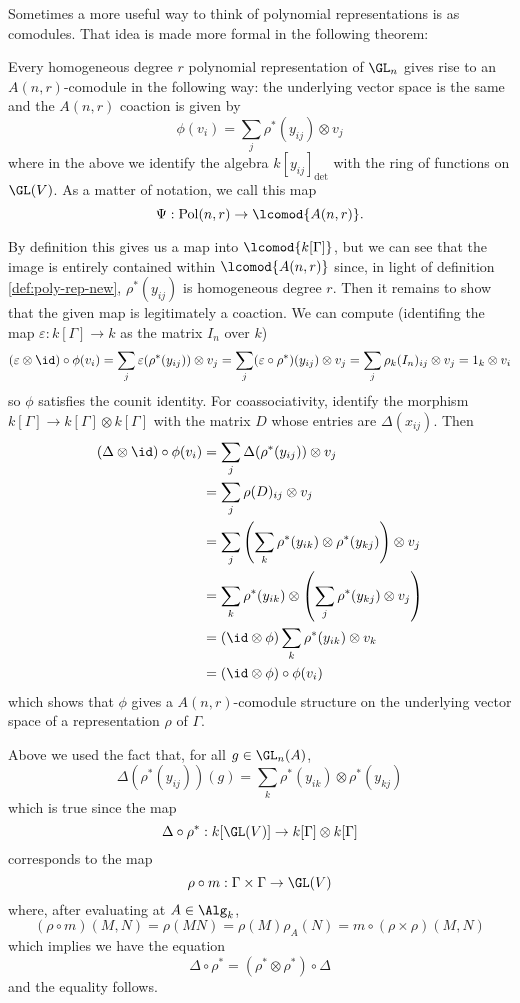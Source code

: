 \documentclass[12pt]{article}
\DeclareMathOperator{\Pol}{Pol}
\begin{document}
Sometimes a more useful way to think of polynomial representations is as comodules. That idea is made more formal
in the following theorem:
\begin{lem}\label{lem:comod-map}
	Every homogeneous degree $r$ polynomial representation of $\GL_n$ gives rise to an $A(n,r)$-comodule
	in the following way: the underlying vector space is the same and the $A(n,r)$ coaction is given by 
	\[\phi(v_i)=\sum_j\rho^\ast(y_{ij})\otimes v_j\]
	where in the above we identify the algebra $k[y_{ij}]_{\det}$ with the ring of functions on $\GL(V)$. As a matter of notation, 
	we call this map 
	\[\Psi:\Pol(n,r)\to \lcomod{A(n,r)}.\]
\end{lem}
\begin{prf}
	By definition this gives us a map into $\lcomod{k[\Gamma]}$, but we can see that the image is entirely contained within 
	$\lcomod{A(n,r)}$ since, in light of definition \ref{def:poly-rep-new}, $\rho^\ast(y_{ij})$ is homogeneous degree $r$.
	Then it remains to show that the given map is legitimately a coaction. We can compute (identifing the map $\varepsilon:k[\Gamma]\to k$ as the matrix $I_n$ over $k$)
	\[(\varepsilon\otimes\id)\circ\phi(v_i)=\sum_j \varepsilon(\rho^\ast(y_{ij}))\otimes v_j=\sum_j(\varepsilon\circ\rho^\ast)(y_{ij})\otimes v_j=\sum_j\rho_k(I_n)_{ij}\otimes v_j=1_k\otimes v_i\]
	so $\phi$ satisfies the counit identity. For coassociativity, identify the morphism $k[\Gamma]\to k[\Gamma]\otimes k[\Gamma]$ with the matrix $D$ whose entries are $\Delta(x_{ij})$. Then
	\begin{align*}
		(\Delta\otimes\id)\circ\phi(v_i)&=\sum_j\Delta(\rho^\ast(y_{ij}))\otimes v_j\\
		&=\sum_j\rho(D)_{ij}\otimes v_j\\
		&=\sum_j \left(\sum_k \rho^\ast(y_{ik})\otimes\rho^\ast(y_{kj})\right)\otimes v_j\\
		&=\sum_k \rho^\ast(y_{ik})\otimes\left(\sum_j \rho^\ast(y_{kj})\otimes v_j\right)\\
		&=(\id\otimes\phi)\sum_k\rho^\ast(y_{ik})\otimes v_k\\
		&=(\id\otimes\phi)\circ\phi(v_i)
	\end{align*}
	which shows that $\phi$ gives a $A(n,r)$-comodule structure on the underlying vector space of a representation $\rho$ of $\Gamma.$
\end{prf}
\begin{rmk}
	Above we used the fact that, for all $g\in\GL_n(A)$, 
	\[\Delta(\rho^\ast(y_{ij}))(g)=\sum_k\rho^\ast(y_{ik})\otimes\rho^\ast(y_{kj})\]
	which is true since the map
	\[\Delta\circ\rho^\ast:k[\GL(V)]\to k[\Gamma]\otimes k[\Gamma]\]
	corresponds to the map 
	\[\rho\circ m:\Gamma\times\Gamma\to \GL(V)\]
	where, after evaluating at $A\in\Alg_k$,
	\[(\rho\circ m)(M,N)=\rho(MN)=\rho(M)\rho_A(N)=m\circ(\rho\times\rho)(M, N)\]
	which implies we have the equation
	\[\Delta\circ \rho^\ast=(\rho^\ast\otimes \rho^\ast)\circ \Delta\]
	and the equality follows.
\end{rmk}
\end{document}
